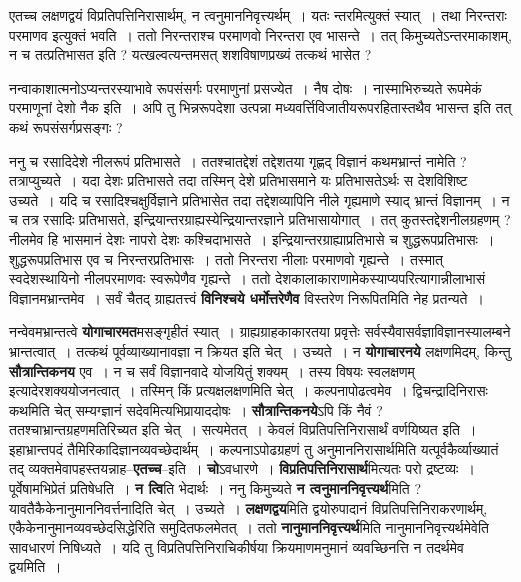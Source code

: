 \documentclass[article,12pt,a4paper]{memoir}
\begin{document}
	एतच्च लक्षणद्वयं विप्रतिपत्तिनिरासार्थम्, न त्वनुमाननिवृत्त्यर्थम् । यतः न्तरमित्युक्तं स्यात् । तथा निरन्तराः परमाणव इत्युक्तं भवति । ततो निरन्तराश्च परमाणवो निरन्तरा एव भासन्ते । तत् किमुच्यतेऽन्तरमाकाशम्, न च तत्प्रतिभासत इति ? यत्खल्वत्यन्तमसत् शशविषाणप्रख्यं तत्कथं भासेत ?
	\pend
      

	  \pstart नन्वाकाशात्मनोऽप्यन्तरस्याभावे रूपसंसर्गः परमाणुनां प्रसज्येत । नैष दोषः । नास्माभिरुच्यते रूपमेकं परमाणूनां देशो नैक इति । अपि तु भिन्नरूपदेशा उत्पन्ना मध्यवर्त्तिविजातीयरूपरहितास्तथैव भासन्त इति तत् कथं रूपसंसर्गप्रसङ्गः ?
	\pend
      

	  \pstart ननु च रसादिदेशे नीलरूपं प्रतिभासते । ततश्चातद्देशं तद्देशतया गृह्णद् विज्ञानं कथमभ्रान्तं नामेति ? तत्राप्युच्यते । यदा देशः प्रतिभासते तदा तस्मिन् देशे प्रतिभासमाने यः प्रतिभासतेऽर्थः स देशविशिष्ट उच्यते । यदि च रसादिश्चक्षुर्विज्ञाने प्रतिभासेत तदा तद्देशव्यापिनि नीले गृह्यमाणे स्याद् भ्रान्तं विज्ञानम् । न च तत्र रसादिः प्रतिभासते, इन्द्रियान्तरग्राह्यस्येन्द्रियान्तरज्ञाने प्रतिभासायोगात् । तत् कुतस्तद्देशनीलग्रहणम् ? नीलमेव हि भासमानं देशः नापरो देशः कश्चिदाभासते । इन्द्रियान्तरग्राह्याप्रतिभासे च शुद्धरूपप्रतिभासः । शुद्धरूपप्रतिभास एव च निरन्तरप्रतिभासः । ततो निरन्तरा नीलाः परमाणवो गृह्यन्ते । तस्मात् स्वदेशस्थायिनो नीलपरमाणवः स्वरूपेणैव गृह्यन्ते । ततो देशकालाकाराणामेकस्याप्यपरित्यागान्नीलाभासं विज्ञानमभ्रान्तमेव । सर्वं चैतद् ग्राह्यतत्त्वं \textbf{विनिश्चये धर्मोत्तरेणैव} विस्तरेण निरूपितमिति नेह प्रतन्यते ।
	\pend
      

	  \pstart नन्वेवमभ्रान्तत्वे \textbf{योगाचारमत}मसङ्गृहीतं स्यात् । ग्राह्यग्राहकाकारतया प्रवृत्तेः सर्वस्यैवासर्वज्ञाविज्ञानस्यालम्बने भ्रान्तत्वात् । तत्कथं पूर्वव्याख्यानावज्ञा न क्रियत इति चेत् । उच्यते । न \textbf{योगाचारनये} लक्षणमिदम्, किन्तु \textbf{सौत्रान्तिकनय} एव । न च सर्वं विज्ञानवादे योजयि\leavevmode{}तुं शक्यम् । तस्य विषयः स्वलक्षणम् इत्यादेरशक्ययोजनत्वात् । तस्मिन् किं प्रत्यक्षलक्षणमिति चेत् । कल्पनापोढत्वमेव । द्विचन्द्रादिनिरासः कथमिति चेत् सम्यग्ज्ञानं सदेवमित्यभिप्रायाददोषः । \textbf{सौत्रान्तिकनये}ऽपि किं नैवं ? ततश्चाभ्रान्तग्रहणमतिरिच्यत इति चेत् । सत्यमेतत् । केवलं विप्रतिपत्तिनिरासार्थं वर्णयिष्यत इति । इहाभ्रान्तपदं तैमिरिकादिज्ञानव्यवच्छेदार्थम् । कल्पनाऽपोढग्रहणं तु अनुमाननिरासार्थमिति यत्पूर्वकैर्व्याख्यातं तद् व्यक्तमेवापहस्तयन्नाह--\textbf{एतच्च}--इति । \textbf{चो}ऽवधारणे । \textbf{विप्रतिपत्तिनिरासार्थ}मित्यतः परो द्रष्टव्यः । पूर्वेषामभिप्रेतं प्रतिषेधति । \textbf{न त्वि}ति भेदार्थः । ननु किमुच्यते \textbf{न त्वनुमाननिवृत्त्यर्थ}मिति ? यावतैकैकेनानुमाननिवर्त्तनादिति चेत् । उच्यते । \textbf{लक्षणद्वय}मिति द्वयोरुपादानं विप्रतिपत्तिनिराकरणार्थम्, एकैकेनानुमानव्यवच्छेदसिद्धेरिति समुदितफलमेतत् । ततो \textbf{नानुमाननिवृत्त्यर्थ}मिति नानुमाननिवृत्त्यर्थमेवेति सावधारणं निषिध्यते । यदि तु विप्रतिपत्तिनिराचिकीर्षया क्रियमाणमनुमानं व्यवच्छिनत्ति न तदर्थमेव द्वयमिति ।
	\pend
      
\end{document}
